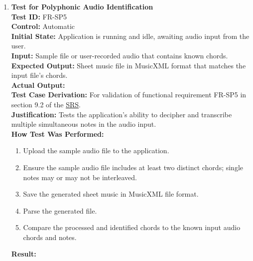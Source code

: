 \documentclass[12pt, titlepage]{article}
\begin{document}
\begin{enumerate}
    \item \textbf{Test for Polyphonic Audio Identification} \\
      \newline
      \textbf{Test ID:} FR-SP5 \\
      \textbf{Control:} Automatic \\
      \textbf{Initial State:} Application is running and idle, awaiting audio input from the user. \\
      \textbf{Input:} Sample file or user-recorded audio that contains known chords. \\
      \textbf{Expected Output:} Sheet music file in MusicXML format that matches the input file’s chords. \\
      \textbf{Actual Output:} \\
      \textbf{Test Case Derivation:} For validation of functional requirement FR-SP5 in section 9.2 of the 
      \href{https://github.com/emilyperica/ScoreGen/blob/main/docs/SRS-Volere/SRS.pdf}{SRS}. \\
      \textbf{Justification:} Tests the application's ability to decipher and transcribe multiple simultaneous notes
      in the audio input. \\
      \textbf{How Test Was Performed:}
      \begin{enumerate}
          \item Upload the sample audio file to the application.
          \item Ensure the sample audio file includes at least two distinct chords; single notes may or may not be interleaved.
          \item Save the generated sheet music in MusicXML file format.
          \item Parse the generated file.
          \item Compare the processed and identified chords to the known input audio chords and notes.
      \end{enumerate}
      \textbf{Result:}
  \end{enumerate}
  
\end{document}

